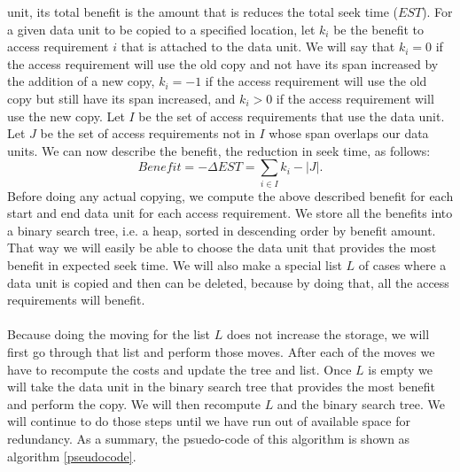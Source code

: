 unit, its total benefit is the amount that is reduces the total seek time
($EST$). For a given data unit to be copied to a specified location, let $k_i$
be the benefit to access requirement $i$ that is attached to the data unit. We
will say that $k_i=0$ if the access requirement will use the old copy and not have its span increased by the addition of a new copy, $k_i=-1$ if the access requirement will use the old copy but still have its span increased, and
$k_i>0$ if the access requirement will use the new copy. Let $I$ be the set of
access requirements that use the data unit. Let $J$ be the set of access
requirements not in $I$ whose span overlaps our data units. We can now describe
the benefit, the reduction in seek time, as follows:
\[
Benefit = -\Delta EST = \sum_{i \in I} k_i - |J|.
\]
Before doing any actual copying, we compute the above described benefit for
each start and end data unit for each access requirement. We store all the
benefits into a binary search tree, i.e. a heap, sorted in descending order by benefit
amount. That way we will easily be able to choose the data unit that provides
the most benefit in expected seek time. We will also make a special list $L$ of
cases where a data unit is copied and then can be deleted, because by doing
that, all the access
requirements will benefit. \\
\\
Because doing the moving for the list $L$ does not increase the storage, we will first go through that list and perform those moves. After each of the moves we have to recompute the costs and update the tree and list. Once $L$ is empty we will take the data unit in the binary search tree that provides the most benefit and perform the copy. We will then recompute $L$ and the binary search tree. We will continue to do those steps until we have run out of available space for redundancy. As a summary, the psuedo-code of this algorithm is shown as algorithm \ref{pseudocode}.

